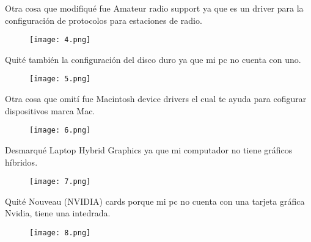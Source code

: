 \documentclass[11pt, a4paper]{report}
\begin{document}
    Otra cosa que modifiqué fue Amateur radio support ya que es un driver
    para la configuración de protocolos para estaciones de radio. \\

    \begin{figure}[!ht] 
      \begin{center}  
        \texttt{[image: 4.png]} 
        \caption{} 
      \end{center} 
    \end{figure}

    Quité también la configuración del disco duro ya que mi pc no cuenta
    con uno. \\

    \begin{figure}[!ht] 
      \begin{center}  
        \texttt{[image: 5.png]} 
        \caption{} 
      \end{center} 
    \end{figure}

    Otra cosa que omití fue Macintosh device drivers el cual te ayuda
    para cofigurar dispositivos marca Mac. \\

    \begin{figure}[!ht] 
      \begin{center}  
        \texttt{[image: 6.png]} 
        \caption{} 
      \end{center} 
    \end{figure}
    
    Desmarqué Laptop Hybrid Graphics ya que mi computador no tiene
    gráficos híbridos. \\
      
    \begin{figure}[!ht] 
      \begin{center}  
        \texttt{[image: 7.png]} 
        \caption{} 
      \end{center} 
    \end{figure}

    Quité Nouveau (NVIDIA) cards porque mi pc no cuenta con una tarjeta
    gráfica Nvidia, tiene una intedrada. \\

    \begin{figure}[!ht] 
      \begin{center}  
        \texttt{[image: 8.png]} 
        \caption{} 
      \end{center} 
    \end{figure}
   
\end{document}
